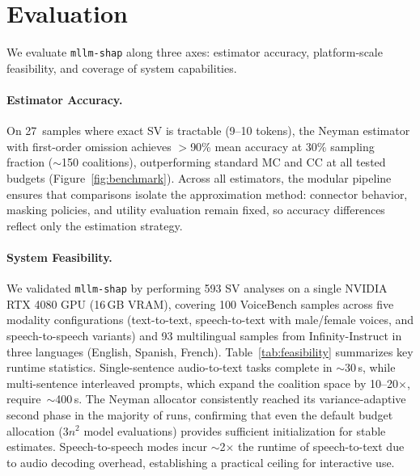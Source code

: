 \documentclass[11pt]{article}
\begin{document}
\section{Evaluation}
\label{sec:eval}

We evaluate \texttt{mllm-shap} along three axes: estimator accuracy, platform-scale feasibility, and coverage of system capabilities.

\paragraph{Estimator Accuracy.}
On 27~samples where exact SV is tractable (9--10 tokens), the Neyman estimator with first-order omission achieves $>$90\% mean accuracy at 30\% sampling fraction ($\sim$150 coalitions), outperforming standard MC and CC at all tested budgets (Figure~\ref{fig:benchmark}).
Across all estimators, the modular pipeline ensures that comparisons isolate the approximation method: connector behavior, masking policies, and utility evaluation remain fixed, so accuracy differences reflect only the estimation strategy.

\paragraph{System Feasibility.}
We validated \texttt{mllm-shap} by performing 593 SV analyses on a single NVIDIA RTX 4080 GPU (16\,GB VRAM), covering 100 VoiceBench \citep{chen2024voicebench} samples across five modality configurations (text-to-text, speech-to-text with male/female voices, and speech-to-speech variants) and 93 multilingual samples from Infinity-Instruct \citep{li2025infinityinstruct} in three languages (English, Spanish, French).
Table~\ref{tab:feasibility} summarizes key runtime statistics.
Single-sentence audio-to-text tasks complete in $\sim$30\,s, while multi-sentence interleaved prompts, which expand the coalition space by 10--20$\times$, require~$\sim$400\,s.
The Neyman allocator consistently reached its variance-adaptive second phase in the majority of runs, confirming that even the default budget allocation ($3n^2$ model evaluations) provides sufficient initialization for stable estimates.
Speech-to-speech modes incur $\sim$2$\times$ the runtime of speech-to-text due to audio decoding overhead, establishing a practical ceiling for interactive use.
\end{document}
